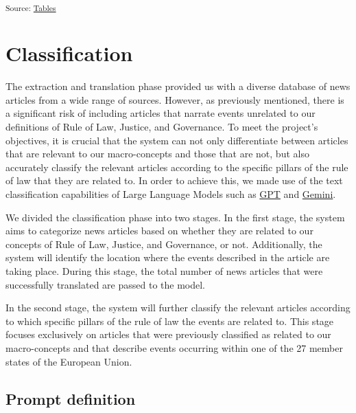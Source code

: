 \documentclass[
]{agujournal2019}
\begin{document}
\textsubscript{Source:
\href{https://ctoruno.github.io/eu-rol-tracker/notebooks/tables-preview.html\#cell-tbl-translation}{Tables}}

\section{Classification}\label{sec-class}

The extraction and translation phase provided us with a diverse database
of news articles from a wide range of sources. However, as previously
mentioned, there is a significant risk of including articles that
narrate events unrelated to our definitions of Rule of Law, Justice, and
Governance. To meet the project's objectives, it is crucial that the
system can not only differentiate between articles that are relevant to
our macro-concepts and those that are not, but also accurately classify
the relevant articles according to the specific pillars of the rule of
law that they are related to. In order to achieve this, we made use of
the text classification capabilities of Large Language Models such as
\href{https://platform.openai.com/docs/concepts}{GPT} and
\href{https://ai.google.dev/gemini-api/docs?_gl=1*1ixp628*_ga*NzAxMDUzNTUyLjE3MDQ0NTQ0NzA.*_ga_P1DBVKWT6V*MTcyNTkwNDYyMi40OC4wLjE3MjU5MDQ2MjIuNjAuMC41MjU1MDg0ODg.}{Gemini}.

We divided the classification phase into two stages. In the first stage,
the system aims to categorize news articles based on whether they are
related to our concepts of Rule of Law, Justice, and Governance, or not.
Additionally, the system will identify the location where the events
described in the article are taking place. During this stage, the total
number of news articles that were successfully translated are passed to
the model.

In the second stage, the system will further classify the relevant
articles according to which specific pillars of the rule of law the
events are related to. This stage focuses exclusively on articles that
were previously classified as related to our macro-concepts and that
describe events occurring within one of the 27 member states of the
European Union.

\subsection{Prompt definition}\label{prompt-definition}
\end{document}
